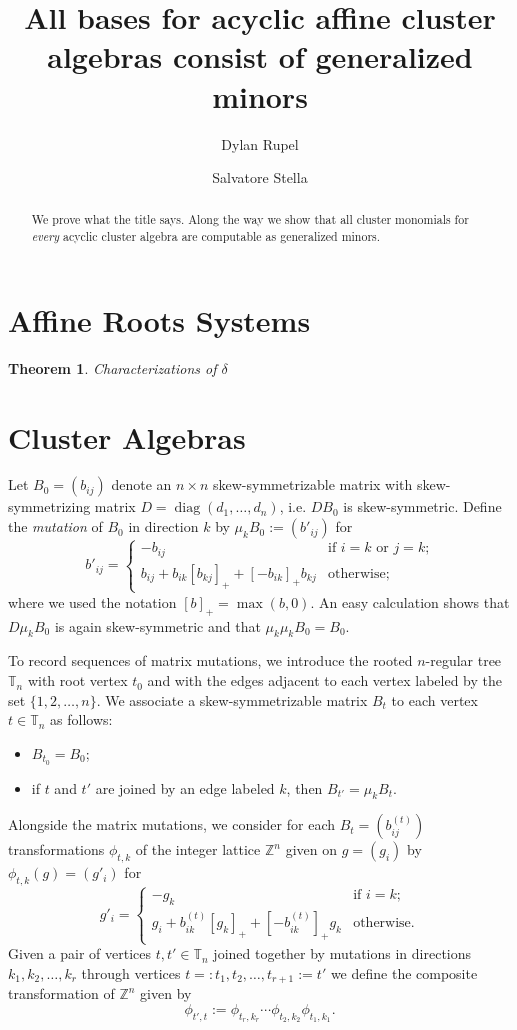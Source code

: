\documentclass{amsart}
\title{All bases for acyclic affine cluster algebras consist of generalized minors}
\author{Dylan Rupel}
\author{Salvatore Stella}
\newtheorem{theorem}{Theorem}
\newcommand{\diag}{\operatorname{diag}}
\newcommand{\TT}{\mathbb{T}}
\newcommand{\ZZ}{\mathbb{Z}}
\begin{document}
  \begin{abstract}
    We prove what the title says.
    Along the way we show that all cluster monomials for \emph{every} acyclic cluster algebra are computable as generalized minors.
  \end{abstract}
  \maketitle

  \section{Affine Roots Systems}
    \begin{theorem}
      Characterizations of $\delta$
    \end{theorem}

  \section{Cluster Algebras}
    Let $B_0=(b_{ij})$ denote an $n\times n$ skew-symmetrizable matrix with skew-symmetrizing matrix $D=\diag(d_1,\ldots,d_n)$, i.e. $DB_0$ is skew-symmetric.
    Define the \emph{mutation} of $B_0$ in direction $k$ by $\mu_k B_0:=(b'_{ij})$ for
    \[b'_{ij}=\begin{cases} -b_{ij} & \text{if $i=k$ or $j=k$;}\\ b_{ij}+b_{ik}[b_{kj}]_++[-b_{ik}]_+b_{kj} & \text{otherwise;}\end{cases}\]
    where we used the notation $[b]_+=\max(b,0)$.
    An easy calculation shows that $D\mu_k B_0$ is again skew-symmetric and that $\mu_k \mu_k B_0 = B_0$.

    To record sequences of matrix mutations, we introduce the rooted $n$-regular tree $\TT_n$ with root vertex $t_0$ and with the edges adjacent to each vertex labeled by the set $\{1,2,\ldots,n\}$.
    We associate a skew-symmetrizable matrix $B_t$ to each vertex $t\in\TT_n$ as follows:
    \begin{itemize}
      \item $B_{t_0}=B_0$;
      \item if $t$ and $t'$ are joined by an edge labeled $k$, then $B_{t'}=\mu_k B_t$.
    \end{itemize}

    Alongside the matrix mutations, we consider for each $B_t=(b^{(t)}_{ij})$ transformations $\phi_{t,k}$ of the integer lattice $\ZZ^n$ given on $g=(g_i)$ by $\phi_{t,k}(g)=(g'_i)$ for
    \[g'_i=\begin{cases} -g_k & \text{if $i=k$;}\\ g_i+b^{(t)}_{ik}[g_k]_++[-b^{(t)}_{ik}]_+g_k & \text{otherwise.}\end{cases}\]
    Given a pair of vertices $t,t'\in\TT_n$ joined together by mutations in directions $k_1,k_2,\ldots,k_r$ through vertices $t=:t_1,t_2,\ldots,t_{r+1}:=t'$ we define the composite transformation of $\ZZ^n$ given by
    \[\phi_{t',t}:= \phi_{t_r,k_r}\cdots \phi_{t_2,k_2}\phi_{t_1,k_1}.\]
\end{document}
